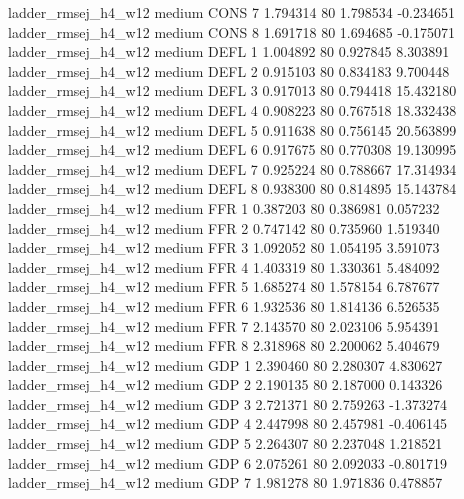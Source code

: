ladder_rmsej_h4_w12     medium     CONS                 7  1.794314 80       1.798534          -0.234651
ladder_rmsej_h4_w12     medium     CONS                 8  1.691718 80       1.694685          -0.175071
ladder_rmsej_h4_w12     medium     DEFL                 1  1.004892 80       0.927845           8.303891
ladder_rmsej_h4_w12     medium     DEFL                 2  0.915103 80       0.834183           9.700448
ladder_rmsej_h4_w12     medium     DEFL                 3  0.917013 80       0.794418          15.432180
ladder_rmsej_h4_w12     medium     DEFL                 4  0.908223 80       0.767518          18.332438
ladder_rmsej_h4_w12     medium     DEFL                 5  0.911638 80       0.756145          20.563899
ladder_rmsej_h4_w12     medium     DEFL                 6  0.917675 80       0.770308          19.130995
ladder_rmsej_h4_w12     medium     DEFL                 7  0.925224 80       0.788667          17.314934
ladder_rmsej_h4_w12     medium     DEFL                 8  0.938300 80       0.814895          15.143784
ladder_rmsej_h4_w12     medium      FFR                 1  0.387203 80       0.386981           0.057232
ladder_rmsej_h4_w12     medium      FFR                 2  0.747142 80       0.735960           1.519340
ladder_rmsej_h4_w12     medium      FFR                 3  1.092052 80       1.054195           3.591073
ladder_rmsej_h4_w12     medium      FFR                 4  1.403319 80       1.330361           5.484092
ladder_rmsej_h4_w12     medium      FFR                 5  1.685274 80       1.578154           6.787677
ladder_rmsej_h4_w12     medium      FFR                 6  1.932536 80       1.814136           6.526535
ladder_rmsej_h4_w12     medium      FFR                 7  2.143570 80       2.023106           5.954391
ladder_rmsej_h4_w12     medium      FFR                 8  2.318968 80       2.200062           5.404679
ladder_rmsej_h4_w12     medium      GDP                 1  2.390460 80       2.280307           4.830627
ladder_rmsej_h4_w12     medium      GDP                 2  2.190135 80       2.187000           0.143326
ladder_rmsej_h4_w12     medium      GDP                 3  2.721371 80       2.759263          -1.373274
ladder_rmsej_h4_w12     medium      GDP                 4  2.447998 80       2.457981          -0.406145
ladder_rmsej_h4_w12     medium      GDP                 5  2.264307 80       2.237048           1.218521
ladder_rmsej_h4_w12     medium      GDP                 6  2.075261 80       2.092033          -0.801719
ladder_rmsej_h4_w12     medium      GDP                 7  1.981278 80       1.971836           0.478857
